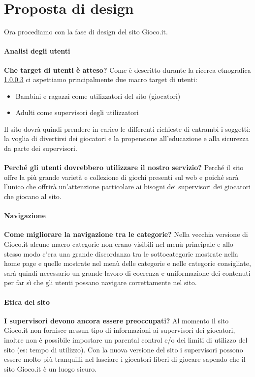 \documentclass[../Report.tex]{subfiles}
\begin{document}
    \chapter{Proposta di design}
    Ora procediamo con la fase di design del sito Gioco.it.
    \subsubsection{Analisi degli utenti}
    \textbf{Che target di utenti è atteso?} Come è descritto durante la ricerca etnografica \ref{} ci aspettiamo principalmente due macro target di utenti:
    \begin{itemize}
        \item Bambini e ragazzi come utilizzatori del sito (giocatori)
        \item Adulti come supervisori degli utilizzatori 
    \end{itemize}

    Il sito dovrà quindi prendere in carico le differenti richieste di entrambi i soggetti: la voglia di divertirsi dei giocatori e la propensione all'educazione e alla sicurezza da parte dei supervisori.\\
    \\
    \textbf{Perché gli utenti dovrebbero utilizzare il nostro servizio?} Perché il sito offre la più grande varietà e collezione di giochi presenti sul web e poiché sarà l'unico che offrirà un'attenzione particolare ai bisogni dei supervisori dei giocatori che giocano al sito.

    \subsubsection{Navigazione}
    \textbf{Come migliorare la navigazione tra le categorie?} Nella vecchia versione di Gioco.it alcune macro categorie non erano visibili nel menù principale e allo stesso modo c'era una grande discordanza tra le sottocategorie mostrate nella home page e quelle mostrate nel menù delle categorie e nelle categorie consigliate, sarà quindi necessario un grande lavoro di coerenza e uniformazione dei contenuti per far sì che gli utenti possano navigare correttamente nel sito.

    \subsubsection{Etica del sito}
    \textbf{I supervisori devono ancora essere preoccupati?} Al momento il sito Gioco.it non fornisce nessun tipo di informazioni ai supervisori dei giocatori, inoltre non è possibile impostare un parental control e/o dei limiti di utilizzo del sito (es: tempo di utilizzo). Con la nuova versione del sito i supervisori possono essere molto più tranquilli nel lasciare i giocatori liberi di giocare sapendo che il sito Gioco.it è un luogo sicuro.
\end{document}
